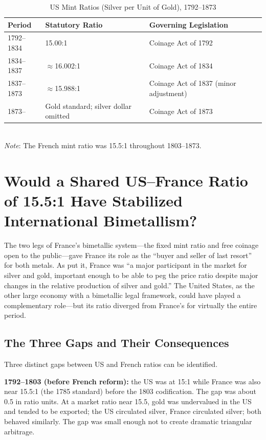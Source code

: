 \documentclass[12pt,letterpaper]{article}
\begin{document}
\begin{table}[h!]
\centering
\caption{US Mint Ratios (Silver per Unit of Gold), 1792--1873}
\label{tab:us_ratios}
\begin{tabular}{lll}
\toprule
\textbf{Period} & \textbf{Statutory Ratio} & \textbf{Governing Legislation} \\
\midrule
1792--1834 & 15.00:1  & Coinage Act of 1792 \\
1834--1837 & $\approx$16.002:1 & Coinage Act of 1834 \\
1837--1873 & $\approx$15.988:1 & Coinage Act of 1837 (minor adjustment) \\
1873--     & Gold standard; silver dollar omitted & Coinage Act of 1873 \\
\bottomrule
\end{tabular}
\smallskip\\
\small\textit{Note}: The French mint ratio was 15.5:1 throughout 1803--1873.
\end{table}

\bigskip

\section{Would a Shared US--France Ratio of 15.5:1 Have Stabilized\\
International Bimetallism?}

The two legs of France's bimetallic system---the fixed mint ratio and free coinage
open to the public---gave France its role as the ``buyer and seller of last resort''
for both metals.  As \citet{friedman1990jep} put it, France was ``a major
participant in the market for silver and gold, important enough to be able to peg
the price ratio despite major changes in the relative production of silver and
gold.''  The United States, as the other large economy with a bimetallic legal
framework, could have played a complementary role---but its ratio diverged from
France's for virtually the entire period.

\subsection{The Three Gaps and Their Consequences}

Three distinct gaps between US and French ratios can be identified.

\textbf{1792--1803 (before French reform):} the US was at 15:1 while France was
also near 15.5:1 (the 1785 standard) before the 1803 codification.  The gap was
about 0.5 in ratio units.  At a market ratio near 15.5, gold was undervalued in
the US and tended to be exported; the US circulated silver, France circulated
silver; both behaved similarly.  The gap was small enough not to create dramatic
triangular arbitrage.
\end{document}

